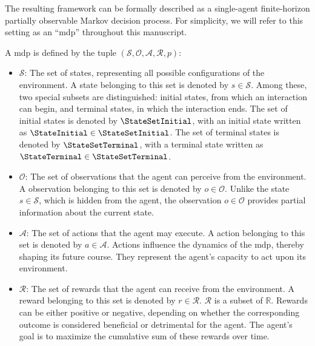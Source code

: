 The resulting framework can be formally described as a single-agent finite-horizon partially observable Markov decision process.
For simplicity, we will refer to this setting as an ``\gls{mdp}'' throughout this manuscript.

A \gls{mdp} is defined by the tuple \((\mathcal{S}, \mathcal{O}, \mathcal{A}, \mathcal{R}, p)\):  
\begin{itemize}
    \item \textbf{\(\mathcal{S}\)}: The set of states, representing all possible configurations of the environment.  
    A state belonging to this set is denoted by \(s \in \mathcal{S}\).  
    Among these, two special subsets are distinguished: initial states, from which an interaction can begin, and terminal states, in which the interaction ends.  
    The set of initial states is denoted by \(\StateSetInitial\), with an initial state written as \(\StateInitial \in \StateSetInitial\).
    The set of terminal states is denoted by \(\StateSetTerminal\), with a terminal state written as \(\StateTerminal \in \StateSetTerminal\).
    
    \item \textbf{\(\mathcal{O}\)}: The set of observations that the agent can perceive from the environment.
    A observation belonging to this set is denoted by \(o \in \mathcal{O}\). 
    Unlike the state \(s \in \mathcal{S}\), which is hidden from the agent, the observation \(o \in \mathcal{O}\) provides partial information about the current state.

    \item \textbf{\(\mathcal{A}\)}: The set of actions that the agent may execute.
    A action belonging to this set is denoted by \(a \in \mathcal{A}\). 
    Actions influence the dynamics of the \gls{mdp}, thereby shaping its future course.  
    They represent the agent's capacity to act upon its environment.

    \item \textbf{\(\mathcal{R}\)}: The set of rewards that the agent can receive from the environment.  
    A reward belonging to this set is denoted by \(r \in \mathcal{R}\). 
    \(\mathcal{R}\) is a subset of \(\mathbb{R}\).
    Rewards can be either positive or negative, depending on whether the corresponding outcome is considered beneficial or detrimental for the agent.  
    The agent's goal is to maximize the cumulative sum of these rewards over time.


\end{itemize}
